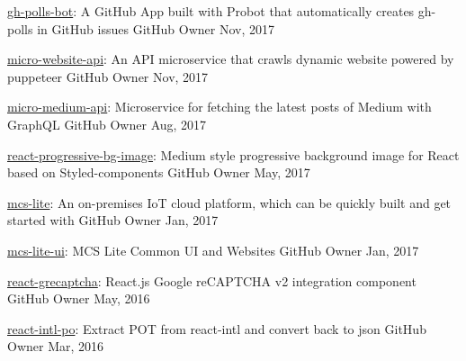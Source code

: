 \begin{cvhonors}
  \cvhonor
    {\href{https://github.com/evenchange4/gh-polls-bot}{gh-polls-bot}: \textmd{A GitHub App built with Probot that automatically creates gh-polls in GitHub issues}}
    {GitHub} %
    {Owner} %
    {Nov, 2017} %

  \cvhonor
    {\href{https://github.com/evenchange4/micro-website-api}{micro-website-api}: \textmd{An API microservice that crawls dynamic website powered by puppeteer}}
    {GitHub} %
    {Owner} %
    {Nov, 2017} %

  \cvhonor
    {\href{https://github.com/evenchange4/micro-medium-api}{micro-medium-api}: \textmd{Microservice for fetching the latest posts of Medium with GraphQL}}
    {GitHub} %
    {Owner} %
    {Aug, 2017} %

  \cvhonor
    {\href{https://github.com/evenchange4/react-progressive-bg-image}{react-progressive-bg-image}: \textmd{Medium style progressive background image for React based on Styled-components}}
    {GitHub} %
    {Owner} %
    {May, 2017} %

  \cvhonor
    {\href{https://github.com/MCS-Lite/mcs-lite}{mcs-lite}: \textmd{An on-premises IoT cloud platform, which can be quickly built and get started with}}
    {GitHub} %
    {Owner} %
    {Jan, 2017} %

  \cvhonor
    {\href{https://github.com/MCS-Lite/mcs-lite}{mcs-lite-ui}: \textmd{MCS Lite Common UI and Websites}}
    {GitHub} %
    {Owner} %
    {Jan, 2017} %

  \cvhonor
    {\href{https://github.com/evenchange4/react-grecaptcha}{react-grecaptcha}: \textmd{React.js Google reCAPTCHA v2 integration component}}
    {GitHub} %
    {Owner} %
    {May, 2016} %

  \cvhonor
    {\href{https://github.com/evenchange4/react-intl-po}{react-intl-po}: \textmd{Extract POT from react-intl and convert back to json}}
    {GitHub} %
    {Owner} %
    {Mar, 2016} %

\end{cvhonors}
